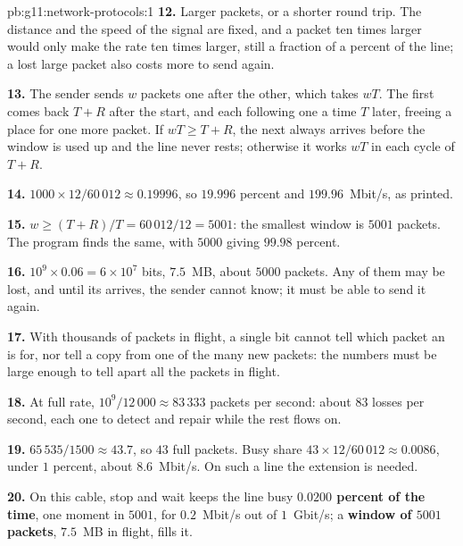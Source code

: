 \begin{solution}{pb:g11:network-protocols:1}
\textbf{12.} Larger packets, or a shorter round trip. The distance and the speed of the signal are fixed, and a packet
ten times larger would only make the rate ten times larger, still a fraction of a percent of the line; a lost large
packet also costs more to send again.

\textbf{13.} The sender sends $w$ packets one after the other, which takes $wT$. The first  comes back
$T + R$ after the start, and each following one a time $T$ later, freeing a place for one more packet. If
$wT \ge T + R$, the next  always arrives before the window is used up and the line never rests;
otherwise it works $wT$ in each cycle of $T + R$.

\textbf{14.} $1000 \times 12 / 60\,012 \approx 0.19996$, so $19.996$ percent and $199.96$~Mbit/s, as printed.

\textbf{15.} $w \ge (T + R) / T = 60\,012 / 12 = 5001$: the smallest window is $5001$ packets. The program finds the
same, with $5000$ giving $99.98$ percent.

\textbf{16.} $10^9 \times 0.06 = 6 \times 10^7$ bits, $7.5$~MB, about $5000$ packets. Any of them may be lost, and
until its  arrives, the sender cannot know; it must be able to send it again.

\textbf{17.} With thousands of packets in flight, a single bit cannot tell which packet an  is for, nor
tell a copy from one of the many new packets: the numbers must be large enough to tell apart all the packets in
flight.

\textbf{18.} At full rate, $10^9 / 12\,000 \approx 83\,333$ packets per second: about $83$ losses per second, each one to
detect and repair while the rest flows on.

\textbf{19.} $65\,535 / 1500 \approx 43.7$, so $43$ full packets. Busy share $43 \times 12 / 60\,012 \approx 0.0086$,
under $1$ percent, about $8.6$~Mbit/s. On such a line the extension is needed.

\textbf{20.} On this cable, stop and wait keeps the line busy \textbf{$0.0200$ percent of the time}, one moment in
$5001$, for $0.2$~Mbit/s out of $1$~Gbit/s; a \textbf{window of $5001$ packets}, $7.5$~MB in flight, fills it.
\end{solution}
